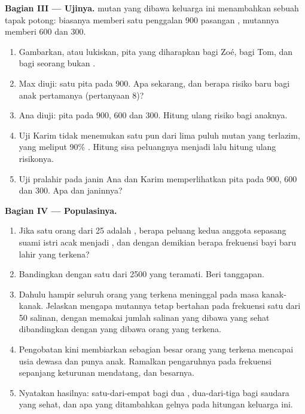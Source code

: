 \begin{problem}
\medskip
\noindent\textbf{Bagian III --- Ujinya.}
 mutan yang dibawa keluarga ini menambahkan sebuah tapak potong:
 biasanya memberi satu penggalan 900 pasangan ,  mutannya
memberi 600 dan 300.
\begin{enumerate}[resume]
  \item Gambarkan, atau lukiskan, pita yang diharapkan bagi Zoé, bagi
        Tom, dan bagi seorang bukan .
  \item Max diuji: satu pita pada 900. Apa  sekarang, dan
        berapa risiko baru bagi anak pertamanya (pertanyaan 8)?
  \item Ana diuji: pita pada 900, 600 dan 300. Hitung ulang risiko bagi
        anaknya.
  \item Uji Karim tidak menemukan satu pun dari lima puluh  mutan
        yang terlazim, yang meliput 90\% . Hitung sisa
        peluangnya menjadi  lalu hitung ulang risikonya.
  \item Uji pralahir pada janin Ana dan Karim memperlihatkan pita pada
        900, 600 dan 300. Apa  dan  janinnya?
\end{enumerate}

\medskip
\noindent\textbf{Bagian IV --- Populasinya.}
\begin{enumerate}[resume]
  \item Jika satu orang dari 25 adalah , berapa peluang kedua
        anggota sepasang suami istri acak menjadi , dan dengan
        demikian berapa frekuensi bayi baru lahir yang terkena?
  \item Bandingkan dengan satu dari 2500 yang teramati. Beri tanggapan.
  \item Dahulu hampir seluruh orang yang terkena meninggal pada masa
        kanak-kanak. Jelaskan mengapa  mutannya tetap bertahan pada
        frekuensi satu dari 50 salinan, dengan memakai jumlah salinan
        yang dibawa  yang sehat dibandingkan dengan yang dibawa
        orang yang terkena.
  \item Pengobatan kini membiarkan sebagian besar orang yang terkena
        mencapai usia dewasa dan punya anak. Ramalkan pengaruhnya pada
        frekuensi  sepanjang keturunan mendatang, dan besarnya.
  \item Nyatakan hasilnya: satu-dari-empat bagi dua ,
        dua-dari-tiga bagi saudara yang sehat, dan apa yang ditambahkan
        gelnya pada hitungan keluarga ini.
\end{enumerate}
\end{problem}
